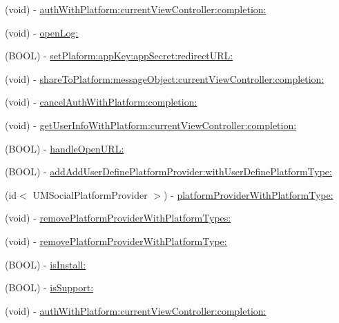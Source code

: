 \begin{DoxyCompactItemize}
(void) -\/ \mbox{\hyperlink{interface_u_m_social_manager_ad5b73eb1c63bd9e2b62f2e01e079af61}{auth\+With\+Platform\+:current\+View\+Controller\+:completion\+:}}
\item 
(void) -\/ \mbox{\hyperlink{interface_u_m_social_manager_aebc3a46ef67f494b872a130057871204}{open\+Log\+:}}
\item 
(B\+O\+OL) -\/ \mbox{\hyperlink{interface_u_m_social_manager_a8214a4f6d823590b7f632f5a615732ed}{set\+Plaform\+:app\+Key\+:app\+Secret\+:redirect\+U\+R\+L\+:}}
\item 
(void) -\/ \mbox{\hyperlink{interface_u_m_social_manager_afebff9032093b6e9ee8a173de3e8fe65}{share\+To\+Platform\+:message\+Object\+:current\+View\+Controller\+:completion\+:}}
\item 
(void) -\/ \mbox{\hyperlink{interface_u_m_social_manager_af4981d741af306f9eff64b4bd3319f47}{cancel\+Auth\+With\+Platform\+:completion\+:}}
\item 
(void) -\/ \mbox{\hyperlink{interface_u_m_social_manager_a156a1ca268b414b55c54138319c9e3f2}{get\+User\+Info\+With\+Platform\+:current\+View\+Controller\+:completion\+:}}
\item 
(B\+O\+OL) -\/ \mbox{\hyperlink{interface_u_m_social_manager_a4f30d7074df154fe5d69ef769603024d}{handle\+Open\+U\+R\+L\+:}}
\item 
(B\+O\+OL) -\/ \mbox{\hyperlink{interface_u_m_social_manager_acad90bcfe7865de06595c6466a227218}{add\+Add\+User\+Define\+Platform\+Provider\+:with\+User\+Define\+Platform\+Type\+:}}
\item 
(id$<$ U\+M\+Social\+Platform\+Provider $>$) -\/ \mbox{\hyperlink{interface_u_m_social_manager_a2fbdd1e6b0106d333c3abd33ad4a4984}{platform\+Provider\+With\+Platform\+Type\+:}}
\item 
(void) -\/ \mbox{\hyperlink{interface_u_m_social_manager_a819b388a668c5ab8e5674d3ff2e9f338}{remove\+Platform\+Provider\+With\+Platform\+Types\+:}}
\item 
(void) -\/ \mbox{\hyperlink{interface_u_m_social_manager_a21a09933474869bd2a402c47c11e6293}{remove\+Platform\+Provider\+With\+Platform\+Type\+:}}
\item 
(B\+O\+OL) -\/ \mbox{\hyperlink{interface_u_m_social_manager_afbc82a79cc8d3e1b7b56339dc90693b9}{is\+Install\+:}}
\item 
(B\+O\+OL) -\/ \mbox{\hyperlink{interface_u_m_social_manager_a6a44376e989d35045a419deb79f535ef}{is\+Support\+:}}
\item 
(void) -\/ \mbox{\hyperlink{interface_u_m_social_manager_ad5b73eb1c63bd9e2b62f2e01e079af61}{auth\+With\+Platform\+:current\+View\+Controller\+:completion\+:}}
\end{DoxyCompactItemize}
